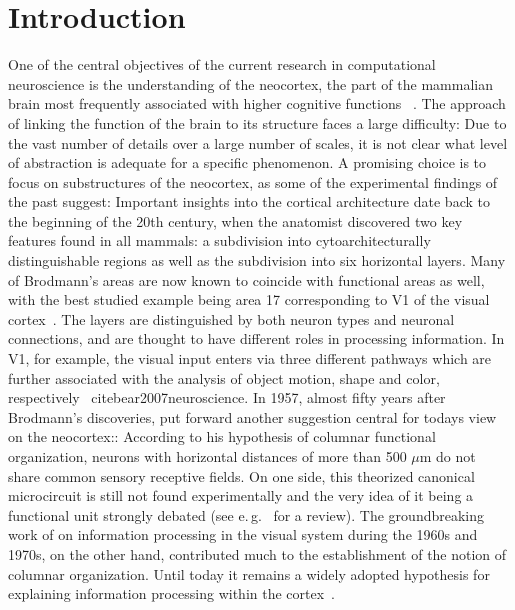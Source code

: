 \chapter{Introduction}
\label{sec:intro}

One of the central objectives of the current research in computational neuroscience
is the understanding of the neocortex, the part of the mammalian brain 
most frequently associated with higher cognitive functions%
~\cite{bear2007neuroscience}.
The approach of linking the function of the brain to its structure faces a large 
difficulty: Due to the vast number of details over a large number of scales, 
it is not clear what level of abstraction is adequate for a specific phenomenon. 
A promising choice is to focus on substructures of the neocortex, as some of the experimental
findings of the past suggest: 
Important insights into the cortical architecture
date back to the beginning of the 20th century, when 
the anatomist  
discovered two key features found in all mammals:
a subdivision into cytoarchitecturally distinguishable regions 
as well as the subdivision into six horizontal 
layers. Many of Brodmann's areas are now known to coincide with functional areas 
as well, with the best studied example being area 17 corresponding to V1 of the
visual cortex~\cite{bear2007neuroscience}. The layers are 
distinguished by both neuron types and neuronal connections,  
and are thought to have different roles in processing information.
In V1, for example, the visual input enters via three different pathways which 
are further associated with the analysis of object motion, shape and color, respectively%
~cite{bear2007neuroscience}.
In 1957, almost fifty years after Brodmann's discoveries, 
put forward another suggestion central for todays view on the neocortex::
According to his hypothesis of columnar functional organization, neurons with horizontal 
distances of more than 500 $\mu$m do not share common sensory receptive fields.
On one side, this theorized canonical microcircuit is still not found experimentally
and the very idea of it being a functional unit strongly debated (see e.\,g.~%
 for a review). The groundbreaking work of 
on information processing in the visual system during the 1960s and 1970s, on the other hand, 
contributed much to the establishment of the notion of columnar organization. 
Until today it remains a widely adopted hypothesis for explaining information processing 
within the cortex~\cite{defelipe2012neocortical}.   


